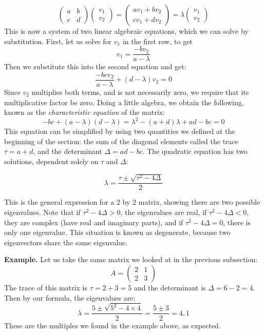 \documentclass[
  letterpaper,
  DIV=11,
  numbers=noendperiod]{scrreprt}
\begin{document}
\[  \left(\begin{array}{cc}a & b \\c & d\end{array}\right)\left(\begin{array}{c}v_1 \\ v_2 \end{array}\right) = \left(\begin{array}{c}av_1 +b v_2\\ cv_1+ dv_2 \end{array}\right) = \lambda \left(\begin{array}{c}v_1 \\ v_2 \end{array}\right)  \]
This is now a system of two linear algebraic equations, which we can
solve by substitution. First, let us solve for \(v_1\) in the first row,
to get \[ v_1 = \frac{-bv_2}{a-\lambda}\] Then we substitute this into
the second equation and get:
\[\frac{-bcv_2}{a-\lambda} +(d-\lambda)v_2 = 0\] Since \(v_2\)
multiplies both terms, and is not necessarily zero, we require that its
multiplicative factor be zero. Doing a little algebra, we obtain the
following, known as the \emph{characteristic equation} of the matrix:
\[ -bc +(a-\lambda)(d-\lambda) = \lambda^2-(a+d)\lambda +ad-bc = 0\]
This equation can be simplified by using two quantities we defined at
the beginning of the section: the sum of the diagonal elements called
the trace \(\tau = a+d\), and the determinant \(\Delta = ad-bc\). The
quadratic equation has two solutions, dependent solely on \(\tau\) and
\(\Delta\):

\[
\lambda = \frac{\tau \pm \sqrt{\tau^2-4\Delta}}{2}
\]

This is the general expression for a 2 by 2 matrix, showing there are
two possible eigenvalues. Note that if \(\tau^2-4\Delta>0\), the
eigenvalues are real, if \(\tau^2-4\Delta<0\), they are complex (have
real and imaginary parts), and if \(\tau^2-4\Delta=0\), there is only
one eigenvalue. This situation is known as degenerate, because two
eigenvectors share the same eigenvalue.

\textbf{Example.} Let us take the same matrix we looked at in the
previous subsection:
\[ A = \left(\begin{array}{cc}2 & 1 \\ 2& 3\end{array}\right)\] The
trace of this matrix is \(\tau = 2+3 =5\) and the determinant is
\(\Delta = 6 - 2 = 4\). Then by our formula, the eigenvalues are:
\[\lambda = \frac{5 \pm \sqrt{5^2-4 \times 4}}{2}  =  \frac{5 \pm 3}{2}  = 4, 1\]
These are the multiples we found in the example above, as expected.
\end{document}

